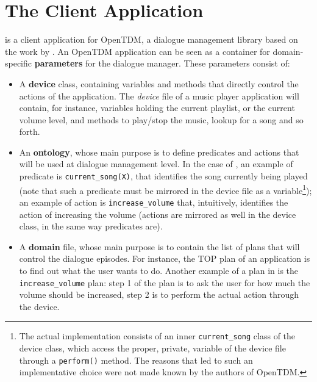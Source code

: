 \section{The Client Application} \label{ch:arch:client}
\pname is a client application for OpenTDM, a dialogue management library based on the work by \cite{Larsson02issue-baseddialogue}. An OpenTDM application can be seen as a container for domain-specific \textbf{parameters} for the dialogue manager. These parameters consist of:
\begin{itemize}
\item A \textbf{device} class, containing variables and methods that directly control the actions of the application. The \textit{device} file of a music player application will contain, for instance, variables holding the current playlist, or the current volume level, and methods to play/stop the music, lookup for a song and so forth.
\item An \textbf{ontology}, whose main purpose is to define predicates and actions that will be used at dialogue management level. In the case of \pname, an example of predicate is \texttt{current\_song(X)}, that identifies the song currently being played (note that such a predicate must be mirrored in the device file as a variable\footnote{The actual implementation consists of an inner \texttt{current\_song} class of the device class, which access the proper, private, variable of the device file through a \texttt{perform()} method. The reasons that led to such an implementative choice were not made known by the authors of OpenTDM.}); an example of action is \texttt{increase\_volume} that, intuitively, identifies the action of increasing the volume (actions are mirrored as well in the device class, in the same way predicates are).
\item A \textbf{domain} file, whose main purpose is to contain the list of plans that will control the dialogue episodes. For instance, the TOP plan of an application is to find out what the user wants to do. Another example of a plan in \pname is the \texttt{increase\_volume} plan: step 1 of the plan is to ask the user for how much the volume should be increased, step 2 is to perform the actual action through the device.


\end{itemize}
